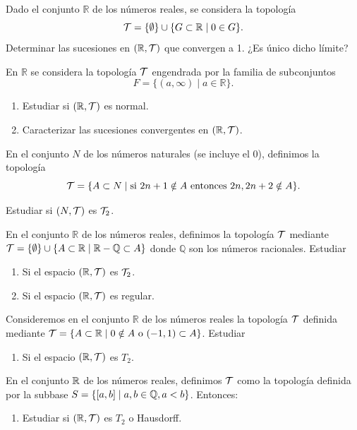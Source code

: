 \begin{ex}
    Dado el conjunto \(\mathbb{R}\) de los números reales, se considera la topología \[\mathcal{T} = \{\emptyset\} \cup \{G \subset \mathbb{R} \mid 0 \in G\}.\]
    Determinar las sucesiones en \((\mathbb{R},\mathcal{T})\) que convergen a 1. ¿Es único dicho límite?
\end{ex}

\begin{ex}

En \(\mathbb{R}\) se considera la topología \(\mathcal{T}\) engendrada por la familia de subconjuntos
    \[
        F = \{(a, \infty) \mid a \in \mathbb{R}\}.
    \]
    \begin{enumerate}[label=\alph*)]
        \item Estudiar si \((\mathbb{R}, \mathcal{T})\) es normal.
        \item Caracterizar las sucesiones convergentes en \((\mathbb{R}, \mathcal{T})\).
    \end{enumerate}
\end{ex}

\begin{ex}
    En el conjunto \(N\) de los números naturales (se incluye el 0), definimos la topología \[\mathcal{T} = \{A \subset N \mid \text{si } 2n + 1 \notin A \text{ entonces } 2n, 2n + 2 \notin A\}.\]
    \item Estudiar si \((N,\mathcal{T})\) es \(\mathcal{T}_2\).
\end{ex}

\begin{ex}
    En el conjunto \(\mathbb{R}\) de los números reales, definimos la topología \(\mathcal{T}\) mediante \(\mathcal{T} = \{\emptyset\} \cup \{A \subset \mathbb{R} \mid \mathbb{R} - \mathbb{Q} \subset A\}\) donde \(\mathbb{Q}\) son los números racionales. Estudiar
    \begin{enumerate}[label=\alph*)]
        \item Si el espacio \((\mathbb{R}, \mathcal{T})\) es \(\mathcal{T}_2\).
        \item Si el espacio \((\mathbb{R}, \mathcal{T})\) es regular.
    \end{enumerate}
\end{ex}

\begin{ex}
    Consideremos en el conjunto \(\mathbb{R}\) de los números reales la topología \(\mathcal{T}\) definida mediante \(\mathcal{T} = \{A \subset \mathbb{R} \mid 0 \notin A \text{ o } (-1, 1) \subset A\}\). Estudiar
    \begin{enumerate}[label=\alph*)]
        \item Si el espacio \((\mathbb{R}, \mathcal{T})\) es \(T_2\).
    \end{enumerate}
\end{ex}

\begin{ex}
    En el conjunto \(\mathbb{R}\) de los números reales, definimos \(\mathcal{T}\) como la topología definida por la subbase \(S = \{[a,b] \mid a, b \in \mathbb{Q}, a < b\}\). Entonces:
    \begin{enumerate}[label=\alph*)]
        \item Estudiar si \((\mathbb{R},\mathcal{T})\) es \(T_2\) o Hausdorff.
    \end{enumerate}
\end{ex}